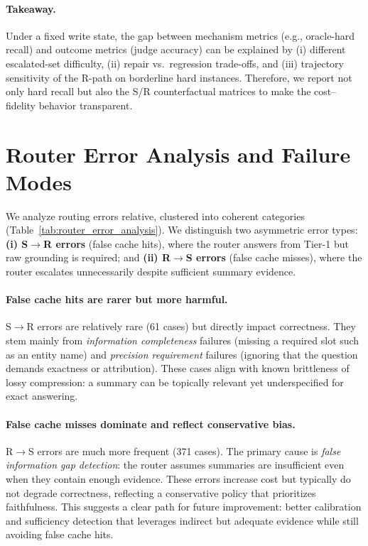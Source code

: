 \documentclass{article}
\theoremstyle{plain}
\theoremstyle{definition}
\theoremstyle{remark}
\begin{document}
\paragraph{Takeaway.}
Under a fixed write state, the gap between mechanism metrics (e.g., oracle-hard recall) and outcome metrics (judge accuracy)
can be explained by (i) different escalated-set difficulty, (ii) repair vs.\ regression trade-offs, and
(iii) trajectory sensitivity of the R-path on borderline hard instances.
Therefore, we report not only hard recall but also the S/R counterfactual matrices to make the cost--fidelity behavior transparent.









\section{Router Error Analysis and Failure Modes}
\label{sec:router_error_analysis}
We analyze routing errors relative, clustered into coherent categories (Table~\ref{tab:router_error_analysis}).
We distinguish two asymmetric error types:
\textbf{(i) S$\rightarrow$R errors} (false cache hits), where the router answers from Tier-1 but raw grounding is required; and
\textbf{(ii) R$\rightarrow$S errors} (false cache misses), where the router escalates unnecessarily despite sufficient summary evidence.

\paragraph{False cache hits are rarer but more harmful.}
S$\rightarrow$R errors are relatively rare (61 cases) but directly impact correctness.
They stem mainly from \emph{information completeness} failures (missing a required slot such as an entity name) and \emph{precision requirement} failures (ignoring that the question demands exactness or attribution).
These cases align with known brittleness of lossy compression: a summary can be topically relevant yet underspecified for exact answering.

\paragraph{False cache misses dominate and reflect conservative bias.}
R$\rightarrow$S errors are much more frequent (371 cases).
The primary cause is \emph{false information gap detection}: the router assumes summaries are insufficient even when they contain enough evidence.
These errors increase cost but typically do not degrade correctness, reflecting a conservative policy that prioritizes faithfulness.
This suggests a clear path for future improvement: better calibration and sufficiency detection that leverages indirect but adequate evidence while still avoiding false cache hits.
\end{document}
